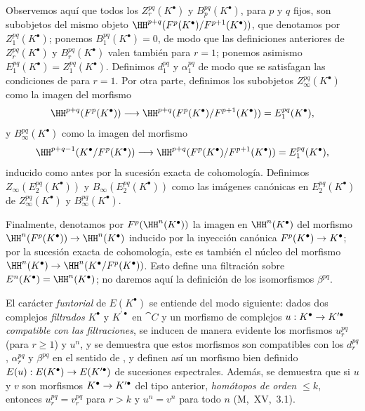 \documentclass[oneside]{amsart}
\makeatletter
\renewcommand{\leq}{\leqslant}
\renewcommand{\geq}{\geqslant}
\newcommand{\ega@arrow}[2]{\mathchoice{#1}{#2}{#2}{#2}}
\renewcommand{\to}{\ega@arrow{\longrightarrow}{\rightarrow}}
\let\EGAOriginalLabel\label
\renewcommand{\label}[1]{\phantomsection\EGAOriginalLabel{#1}}
\makeatother
\begin{document}
\begin{env}[11.2.2]
Observemos aquí que todos los $Z_r^{pq}(K^\bullet)$ y $B_p^{pq}(K^\bullet)$, para $p$ y $q$ fijos, son subobjetos del mismo objeto $\HH^{p+q}(F^p(K^\bullet)/F^{p+1}(K^\bullet))$, que denotamos por $Z_1^{pq}(K^\bullet)$; ponemos $B_1^{pq}(K^\bullet)=0$, de modo que las definiciones anteriores de $Z_r^{pq}(K^\bullet)$ y $B_r^{pq}(K^\bullet)$ valen también para $r=1$; ponemos asimismo $E_1^{pq}(K^\bullet)=Z_1^{pq}(K^\bullet)$.
Definimos $d_1^{pq}$ y $\alpha_1^{pq}$ de modo que se satisfagan las condiciones de  para $r=1$.
Por otra parte, definimos los subobjetos $Z_\infty^{pq}(K^\bullet)$ como la imagen del morfismo
\[
  \HH^{p+q}(F^p(K^\bullet))\to\HH^{p+q}(F^p(K^\bullet)/F^{p+1}(K^\bullet))=E_1^{pq}(K^\bullet),
\]
y $B_\infty^{pq}(K^\bullet)$ como la imagen del morfismo
\[
  \HH^{p+q-1}(K^\bullet/F^p(K^\bullet))\to\HH^{p+q}(F^p(K^\bullet)/F^{p+1}(K^\bullet))=E_1^{pq}(K^\bullet),
\]
inducido como antes por la sucesión exacta de cohomología.
Definimos $Z_\infty(E_2^{pq}(K^\bullet))$ y $B_\infty(E_2^{pq}(K^\bullet))$ como las imágenes canónicas en $E_2^{pq}(K^\bullet)$ de $Z_\infty^{pq}(K^\bullet)$ y $B_\infty^{pq}(K^\bullet)$.

Finalmente, denotamos por $F^p(\HH^n(K^\bullet))$ la imagen en $\HH^n(K^\bullet)$ del morfismo $\HH^n(F^p(K^\bullet))\to\HH^n(K^\bullet)$ inducido por la inyección canónica $F^p(K^\bullet)\to K^\bullet$; por la sucesión exacta de cohomología, este es también el núcleo del morfismo $\HH^n(K^\bullet)\to\HH^n(K^\bullet/F^p(K^\bullet))$.
Esto define una filtración sobre $E^n(K^\bullet)=\HH^n(K^\bullet)$; no daremos aquí la definición de los isomorfismos $\beta^{pq}$.
\end{env}

\begin{env}[11.2.3]
\label{0.11.2.3}
El carácter \emph{funtorial} de $E(K^\bullet)$ se entiende del modo siguiente: dados dos complejos \emph{filtrados} $K^\bullet$ y $K^{\prime\bullet}$ en $\cat{C}$ y un morfismo de complejos $u:K^\bullet\to K^{\prime\bullet}$ \emph{compatible con las filtraciones}, se inducen de manera evidente los morfismos $u_r^{pq}$ (para $r\geq 1$) y $u^n$, y se demuestra que estos morfismos son compatibles con los $d_r^{pq}$, $\alpha_r^{pq}$ y $\beta^{pq}$ en el sentido de , y definen así un morfismo bien definido $E(u):E(K^\bullet)\to E(K^{\prime\bullet})$ de sucesiones espectrales.
Además, se demuestra que si $u$ y $v$ son morfismos $K^\bullet\to K^{\prime\bullet}$ del tipo anterior, \emph{homótopos de orden $\leq k$}, entonces $u_r^{pq}=v_r^{pq}$ para $r>k$ y $u^n=v^n$ para todo $n$ (M,~XV,~3.1).
\end{env}
\end{document}
